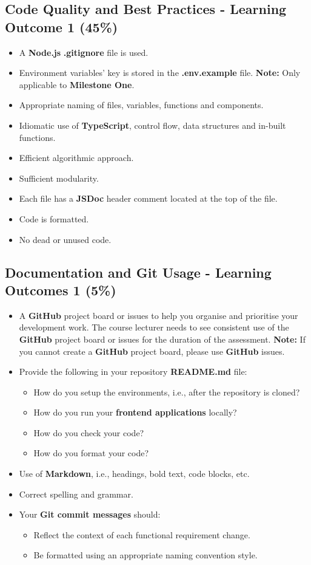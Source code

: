 \documentclass{article}
\begin{document}
\subsection*{Code Quality and Best Practices - Learning Outcome 1 (45\%)}
\begin{itemize}
	\item A \textbf{Node.js} \textbf{.gitignore} file is used.
	\item Environment variables' key is stored in the \textbf{.env.example} file. \textbf{Note:} Only applicable to \textbf{Milestone One}.
  	\item Appropriate naming of files, variables, functions and components.
	\item Idiomatic use of \textbf{TypeScript}, control flow, data structures and in-built functions.
	\item Efficient algorithmic approach.
	\item Sufficient modularity.
	\item Each file has a \textbf{JSDoc} header comment located at the top of the file.
	\item Code is formatted.
	\item No dead or unused code. 
\end{itemize}

\subsection*{Documentation and Git Usage - Learning Outcomes 1 (5\%)}
\begin{itemize}
	\item A \textbf{GitHub} project board or issues to help you organise and prioritise your development work. The course lecturer needs to see consistent use of the \textbf{GitHub} project board or issues for the duration of the assessment. \textbf{Note:} If you cannot create a \textbf{GitHub} project board, please use \textbf{GitHub} issues.
	\item Provide the following in your repository \textbf{README.md} file:
	\begin{itemize}
		\item How do you setup the environments, i.e., after the repository is cloned?
		\item How do you run your \textbf{frontend applications} locally?
		\item How do you check your code?
		\item How do you format your code?
	\end{itemize}
    \item Use of \textbf{Markdown}, i.e., headings, bold text, code blocks, etc.
    \item Correct spelling and grammar.
    \item Your \textbf{Git commit messages} should:
    \begin{itemize}
      \item Reflect the context of each functional requirement change.
      \item Be formatted using an appropriate naming convention style.
    \end{itemize}
\end{itemize}
\end{document}
